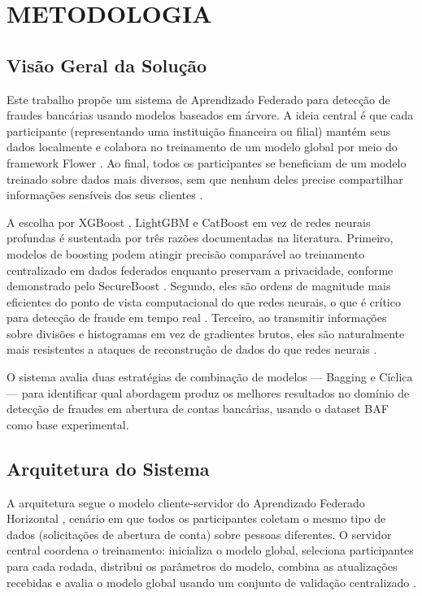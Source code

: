 \section{METODOLOGIA}

\subsection{Visão Geral da Solução}

Este trabalho propõe um sistema de Aprendizado Federado para detecção de fraudes bancárias usando modelos baseados em árvore. A ideia central é que cada participante (representando uma instituição financeira ou filial) mantém seus dados localmente e colabora no treinamento de um modelo global por meio do framework Flower \cite{flower2020}. Ao final, todos os participantes se beneficiam de um modelo treinado sobre dados mais diversos, sem que nenhum deles precise compartilhar informações sensíveis dos seus clientes \cite{yang2019fl, kennedy2025financial}.

A escolha por XGBoost \cite{chen2016xgboost}, LightGBM \cite{ke2017lightgbm} e CatBoost \cite{prokhorenkova2018catboost} em vez de redes neurais profundas é sustentada por três razões documentadas na literatura. Primeiro, modelos de boosting podem atingir precisão comparável ao treinamento centralizado em dados federados enquanto preservam a privacidade, conforme demonstrado pelo SecureBoost \cite{cheng2021secureboost}. Segundo, eles são ordens de magnitude mais eficientes do ponto de vista computacional do que redes neurais, o que é crítico para detecção de fraude em tempo real \cite{li2023fedtree}. Terceiro, ao transmitir informações sobre divisões e histogramas em vez de gradientes brutos, eles são naturalmente mais resistentes a ataques de reconstrução de dados do que redes neurais \cite{liu2024survey, zhu2019deepleakage}.

O sistema avalia duas estratégias de combinação de modelos --- Bagging e Cíclica --- para identificar qual abordagem produz os melhores resultados no domínio de detecção de fraudes em abertura de contas bancárias, usando o dataset BAF \cite{jesus2022baf} como base experimental.

\subsection{Arquitetura do Sistema}

A arquitetura segue o modelo cliente-servidor do Aprendizado Federado Horizontal \cite{yang2019fl}, cenário em que todos os participantes coletam o mesmo tipo de dados (solicitações de abertura de conta) sobre pessoas diferentes. O servidor central coordena o treinamento: inicializa o modelo global, seleciona participantes para cada rodada, distribui os parâmetros do modelo, combina as atualizações recebidas e avalia o modelo global usando um conjunto de validação centralizado \cite{bonawitz2019scale}.

